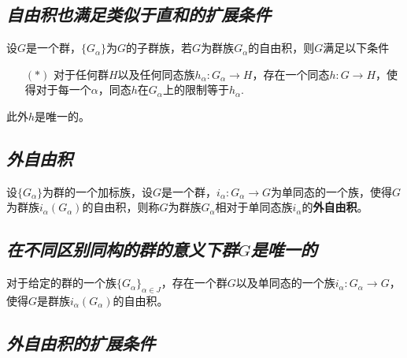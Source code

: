 \subsection*{\textsl{自由积也满足类似于直和的扩展条件}}

\begin{mdframed}
    \begin{lemma}
        设$G$是一个群，$\{G_\alpha\}$为$G$的子群族，若$G$为群族$G_\alpha$的自由积，则$G$满足以下条件
        \begin{enumerate}[itemindent=2em]
            \item[$(*)$] 对于任何群$H$以及任何同态族$h_\alpha:G_\alpha\rightarrow H$，存在一个同态$h:G\rightarrow H$，使得对于每一个$\alpha$，同态$h$在$G_\alpha$上的限制等于$h_\alpha$.
        \end{enumerate}

        此外$h$是唯一的。
    \end{lemma}
\end{mdframed}

\subsection*{\textsl{外自由积}}

\begin{mdframed}
    \begin{define}
        设$\{G_\alpha\}$为群的一个加标族，设$G$是一个群，$i_\alpha:G_\alpha\rightarrow G$为单同态的一个族，使得$G$为群族$i_\alpha(G_\alpha)$的自由积，则称$G$为群族$G_\alpha$相对于单同态族$i_\alpha$的\textbf{外自由积}。
    \end{define}
\end{mdframed}

\subsection*{\textsl{在不同区别同构的群的意义下群$G$是唯一的}}

\begin{mdframed}
    \begin{theorem}
        对于给定的群的一个族$\{G_\alpha\}_{\alpha\in J}$，存在一个群$G$以及单同态的一个族$i_\alpha:G_\alpha\rightarrow G$，使得$G$是群族$i_\alpha(G_\alpha)$的自由积。
    \end{theorem}
\end{mdframed}

\subsection*{\textsl{外自由积的扩展条件}}

